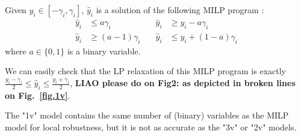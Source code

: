     \begin{proposition}
    \label{prop3}
    Given $y_i \in [-\gamma_i,\gamma_i]$, 
    $\hat{y}_i$ is a solution of the following MILP program :\begin{align*}
		\hat{y}_i &\leq a \gamma_i               &\quad \hat{y}_i &\geq y_i - a \gamma_i \\
		\hat{y}_i &\geq (a-1) \gamma_i           &\quad \hat{y}_i &\leq y_i + (1-a) \gamma_i
	\end{align*} where $a \in \{0,1\}$ is a binary variable.
	\end{proposition}

    We can easily check that the LP relaxation of this MILP program is exactly 
    $\frac{y_i-\gamma_i}{2} \leq \hat{y}_i \leq \frac{y_i+\gamma_i}{2}$, 
    {\bf LIAO please do on Fig2: as depicted in broken lines on Fig.~\ref{fig.1v}}.
    
	
	

	\iffalse
	Based on above constraints, we can sketch this simplified model:
	\begin{enumerate}
		\item For each input node, each output node, and each pre-activation and post-activation node in the hidden layers,  set one variable $y_i$. 
		\item Set constraints for input nodes.
		\item Set linear constraints . In this case, since the meaning of $y_i$ is $x_i-x'_i$, this constraints will not use the bias.
		\item Between pre- and post- activation nodes, set the MILP constraint described above.
	\end{enumerate}
	
	The key point is that, although this model sets 3 variables (and their binary variables) for each node in the network, only $y_i$  contributes to the final results, and we can ignore $x_i,x_i'$ (and their binary variables) during the optimization.
	
	As a result, we can relax the binary variables used to $\hat{x}_i = \ReLU(x_i)$ and $\hat{x}'_i = \ReLU(x'_i)$.
	\fi

	The "1v" model contains the same number of (binary) variables as the MILP model for local robustness, but it is not as accurate as the "3v" or "2v" models. 
    


    